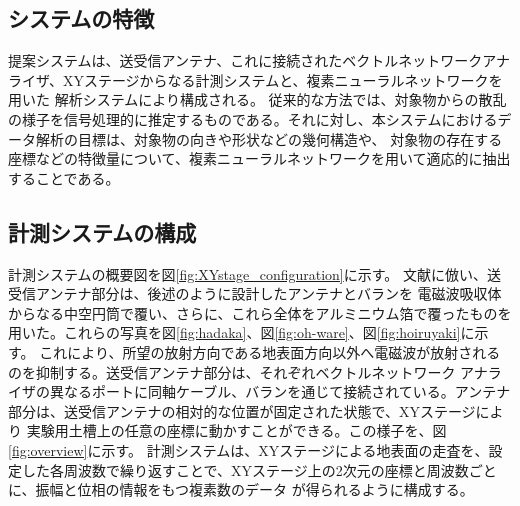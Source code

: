 \documentclass[11pt,a4paper,uplatex]{ujarticle}
\begin{document}
  
  \subsection{システムの特徴}
    
    提案システムは、送受信アンテナ、これに接続されたベクトルネットワークアナライザ、XYステージからなる計測システムと、複素ニューラルネットワークを用いた
    解析システムにより構成される。
    従来的な方法では、対象物からの散乱の様子を信号処理的に推定するものである。それに対し、本システムにおけるデータ解析の目標は、対象物の向きや形状などの幾何構造や、
    対象物の存在する座標などの特徴量について、複素ニューラルネットワークを用いて適応的に抽出することである。

  \subsection{計測システムの構成}

    計測システムの概要図を図\ref{fig:XYstage_configuration}に示す。
    文献\cite{absorbing_material}に倣い、送受信アンテナ部分は、後述のように設計したアンテナとバランを
    電磁波吸収体からなる中空円筒で覆い、さらに、これら全体をアルミニウム箔で覆ったものを用いた。これらの写真を図\ref{fig:hadaka}、図\ref{fig:oh-ware}、図\ref{fig:hoiruyaki}に示す。
    これにより、所望の放射方向である地表面方向以外へ電磁波が放射されるのを抑制する。送受信アンテナ部分は、それぞれベクトルネットワーク
    アナライザの異なるポートに同軸ケーブル、バランを通じて接続されている。アンテナ部分は、送受信アンテナの相対的な位置が固定された状態で、XYステージにより
    実験用土槽上の任意の座標に動かすことができる。この様子を、図\ref{fig:overview}に示す。
    計測システムは、XYステージによる地表面の走査を、設定した各周波数で繰り返すことで、XYステージ上の2次元の座標と周波数ごとに、振幅と位相の情報をもつ複素数のデータ
    が得られるように構成する。
\end{document}
